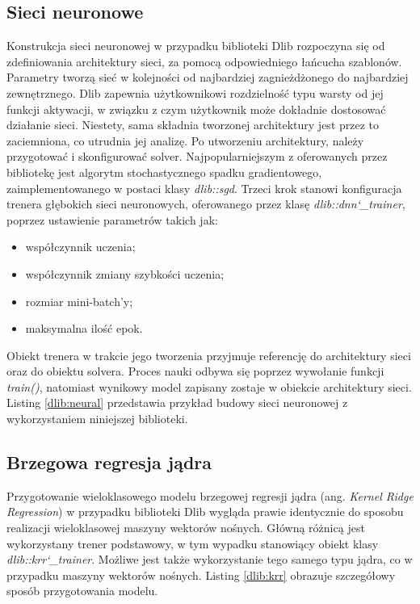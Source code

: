 
\subsection{Sieci neuronowe}

Konstrukcja sieci neuronowej w przypadku biblioteki Dlib rozpoczyna się od zdefiniowania architektury sieci, za pomocą odpowiedniego łańcucha szablonów. Parametry tworzą sieć w kolejności od najbardziej zagnieżdżonego do najbardziej zewnętrznego. Dlib zapewnia użytkownikowi rozdzielność typu warsty od jej funkcji aktywacji, w związku z czym użytkownik może dokładnie dostosować działanie sieci. Niestety, sama składnia tworzonej architektury jest przez to zaciemniona, co utrudnia jej analizę. Po utworzeniu architektury, należy przygotować i skonfigurować solver. Najpopularniejszym z oferowanych przez bibliotekę jest algorytm stochastycznego spadku gradientowego, zaimplementowanego w postaci klasy \textit{dlib::sgd}. Trzeci krok stanowi konfiguracja trenera głębokich sieci neuronowych, oferowanego przez klasę \textit{dlib::dnn\char`_trainer}, poprzez ustawienie parametrów takich jak:

\begin{itemize}
	\item współczynnik uczenia;
	\item współczynnik zmiany szybkości uczenia; 
	\item rozmiar mini-batch'y;
	\item maksymalna ilość epok.
\end{itemize}

Obiekt trenera w trakcie jego tworzenia przyjmuje referencję do architektury sieci oraz do obiektu solvera. Proces nauki odbywa się poprzez wywołanie funkcji \textit{train()}, natomiast wynikowy model zapisany zostaje w obiekcie architektury sieci. Listing \ref{dlib:neural} przedstawia przykład budowy sieci neuronowej z wykorzystaniem niniejszej biblioteki.


\subsection{Brzegowa regresja jądra}

Przygotowanie wieloklasowego modelu brzegowej regresji jądra (ang. \textit{Kernel Ridge Regression}) w przypadku biblioteki Dlib wygląda prawie identycznie do sposobu realizacji wieloklasowej maszyny wektorów nośnych. Główną różnicą jest wykorzystany trener podstawowy, w tym wypadku stanowiący obiekt klasy \textit{dlib::krr\char`_trainer}. Możliwe jest także wykorzystanie tego samego typu jądra, co w przypadku maszyny wektorów nośnych. Listing \ref{dlib:krr} obrazuje szczegółowy sposób przygotowania modelu.

